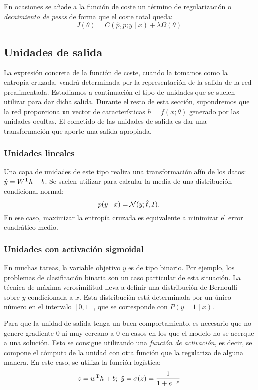 En ocasiones se añade a la función de coste un término de regularización
o \emph{decaimiento de pesos} de forma que el coste total queda:
\[J(\theta)=C(\hat p, p;y\mid x) + \lambda \Omega(\theta)\]

\subsection{Unidades de salida}\label{unidades-de-salida}

La expresión concreta de la función de coste, cuando la tomamos como la
entropía cruzada, vendrá determinada por la representación de la salida
de la red prealimentada. Estudiamos a continuación el tipo de unidades
que se suelen utilizar para dar dicha salida. Durante el resto de esta
sección, supondremos que la red proporciona un vector de características
\(h=f(x;\theta)\) generado por las unidades ocultas. El cometido de las
unidades de salida es dar una transformación que aporte una salida
apropiada.

\subsubsection{Unidades lineales}\label{unidades-lineales}

Una capa de unidades de este tipo realiza una transformación afín de los
datos: \(\hat y=W^{\mathrm{T}}h+b\). Se suelen utilizar para calcular la media de
una distribución condicional normal: \[p(y\mid x)=\mathcal{N}(y;\hat t,I).\] En
ese caso, maximizar la entropía cruzada es equivalente a minimizar el
error cuadrático medio.

\subsubsection{Unidades con activación
sigmoidal}\label{unidades-con-activaciuxf3n-sigmoidal}

En muchas tareas, la variable objetivo \(y\) es de tipo binario. Por
ejemplo, los problemas de clasificación binaria son un caso particular
de esta situación. La técnica de máxima verosimilitud lleva a definir
una distribución de Bernoulli sobre \(y\) condicionada a \(x\). Esta
distribución está determinada por un único número en el intervalo
\([0, 1]\), que se corresponde con \(P(y=1\mid x)\).

Para que la unidad de salida tenga un buen comportamiento, es necesario
que no genere gradiente 0 ni muy cercano a 0 en casos en los que el
modelo no se acerque a una solución. Esto se consigue utilizando una
\emph{función de activación}, es decir, se compone el cómputo de la
unidad con otra función que la regulariza de alguna manera. En este
caso, se utiliza la función logística:
\[z=w^{\mathrm{T}}h+b;\ \hat y = \sigma(z) = \frac{1}{1+e^{-z}}\]

